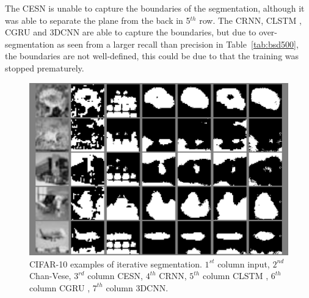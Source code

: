 \documentclass{WitsPhysicsReport}
\begin{document}
The CESN is unable to capture the boundaries of the segmentation, although it was able to separate the plane from the back in 5$^{th}$ row. The CRNN, CLSTM , CGRU and 3DCNN are able to capture the boundaries, but due to over-segmentation as seen from a larger recall than precision in Table~\ref{tab:bsd500}, the boundaries are not well-defined, this could be due to that the training was stopped prematurely.


\begin{figure}[H]
\centering
  \includegraphics[width=1\linewidth]{Figure/Results/CIFAR_10_sample.png}
  \caption{CIFAR-10 examples of iterative segmentation. $1^{st}$ column input, $2^{nd}$ Chan-Vese, $3^{rd}$ column CESN, $4^{th}$ CRNN, $5^{th}$ column CLSTM , $6^{th}$ column CGRU , $7^{th}$ column 3DCNN.}
 \label{fig:sample_results_cifar10}
\end{figure}

\end{document}
